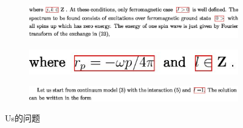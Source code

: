 \begin{figure}[hp]
    \centering

    \begin{subfigure}[b]{\linewidth}
    \centering
    \includegraphics[scale=0.3]{eps/us1.eps}
    \caption{\label{fig:fig1}}
    \end{subfigure}

    \begin{subfigure}[b]{\linewidth}
    \centering
    \includegraphics[scale=0.3]{eps/us2.eps}
    \caption{\label{fig:fig2}}
    \end{subfigure}

    \begin{subfigure}[b]{\linewidth}
    \centering
    \includegraphics[scale=0.3]{eps/us3.eps}
    \caption{\label{fig:fig3}}
    \end{subfigure}


    \caption{Us的问题}
    \label{fig:label}
\end{figure}


